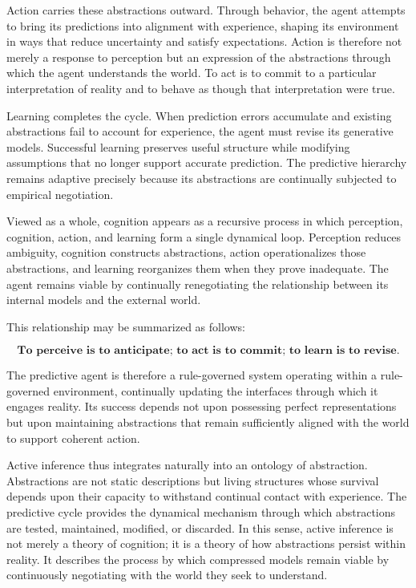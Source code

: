 \documentclass[12pt,letterpaper]{article}
\theoremstyle{remark}
\begin{document}
Action carries these abstractions outward. Through behavior, the agent attempts to bring its predictions into alignment with experience, shaping its environment in ways that reduce uncertainty and satisfy expectations. Action is therefore not merely a response to perception but an expression of the abstractions through which the agent understands the world. To act is to commit to a particular interpretation of reality and to behave as though that interpretation were true.

Learning completes the cycle. When prediction errors accumulate and existing abstractions fail to account for experience, the agent must revise its generative models. Successful learning preserves useful structure while modifying assumptions that no longer support accurate prediction. The predictive hierarchy remains adaptive precisely because its abstractions are continually subjected to empirical negotiation.

Viewed as a whole, cognition appears as a recursive process in which perception, cognition, action, and learning form a single dynamical loop. Perception reduces ambiguity, cognition constructs abstractions, action operationalizes those abstractions, and learning reorganizes them when they prove inadequate. The agent remains viable by continually renegotiating the relationship between its internal models and the external world.

This relationship may be summarized as follows:

\[
\textbf{To perceive is to anticipate; to act is to commit; to learn is to revise.}
\]

The predictive agent is therefore a rule-governed system operating within a rule-governed environment, continually updating the interfaces through which it engages reality. Its success depends not upon possessing perfect representations but upon maintaining abstractions that remain sufficiently aligned with the world to support coherent action.

Active inference thus integrates naturally into an ontology of abstraction. Abstractions are not static descriptions but living structures whose survival depends upon their capacity to withstand continual contact with experience. The predictive cycle provides the dynamical mechanism through which abstractions are tested, maintained, modified, or discarded. In this sense, active inference is not merely a theory of cognition; it is a theory of how abstractions persist within reality. It describes the process by which compressed models remain viable by continuously negotiating with the world they seek to understand.
\end{document}

